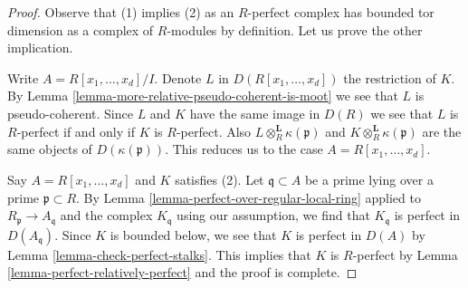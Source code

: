 \documentclass[10pt,a4paper]{amsart}
\theoremstyle{plain}
\theoremstyle{definition}
\theoremstyle{remark}
\numberwithin{equation}{subsection}
\begin{document}
\begin{proof}
Observe that (1) implies (2) as an $R$-perfect complex has bounded
tor dimension as a complex of $R$-modules by definition. Let us prove
the other implication.

\medskip\noindent
Write $A = R[x_1, \ldots, x_d]/I$. Denote $L$ in $D(R[x_1, \ldots, x_d])$
the restriction of $K$. By
Lemma \ref{lemma-more-relative-pseudo-coherent-is-moot}
we see that $L$ is pseudo-coherent.
Since $L$ and $K$ have the same image in $D(R)$ we see that
$L$ is $R$-perfect if and only if $K$ is $R$-perfect.
Also $L \otimes_R^\mathbf{L} \kappa(\mathfrak p)$
and $K \otimes_R^\mathbf{L} \kappa(\mathfrak p)$ are the same objects of
$D(\kappa(\mathfrak p))$. This reduces us to the case
$A = R[x_1, \ldots, x_d]$.

\medskip\noindent
Say $A = R[x_1, \ldots, x_d]$ and $K$ satisfies (2).
Let $\mathfrak q \subset A$ be a prime lying over a
prime $\mathfrak p \subset R$. By
Lemma \ref{lemma-perfect-over-regular-local-ring} applied
to $R_\mathfrak p \to A_\mathfrak q$ and the complex $K_\mathfrak q$
using our assumption, we find that $K_\mathfrak q$ is perfect
in $D(A_\mathfrak q)$. Since $K$ is bounded below, we see that
$K$ is perfect in $D(A)$ by 
Lemma \ref{lemma-check-perfect-stalks}.
This implies that $K$ is $R$-perfect by
Lemma \ref{lemma-perfect-relatively-perfect}
and the proof is complete.
\end{proof}
\end{document}
